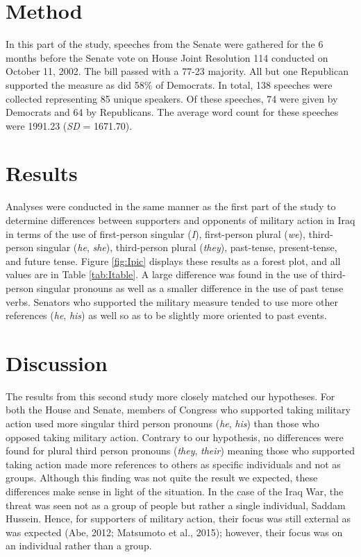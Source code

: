 \documentclass[english,man]{apa6}
\theoremstyle{definition}
\theoremstyle{definition}
\theoremstyle{definition}
\theoremstyle{remark}
\begin{document}
\section{Method}\label{method-4}

In this part of the study, speeches from the Senate were gathered for
the 6 months before the Senate vote on House Joint Resolution 114
conducted on October 11, 2002. The bill passed with a 77-23 majority.
All but one Republican supported the measure as did 58\% of Democrats.
In total, 138 speeches were collected representing 85 unique speakers.
Of these speeches, 74 were given by Democrats and 64 by Republicans. The
average word count for these speeches were 1991.23 (\emph{SD} =
1671.70).

\section{Results}\label{results-3}

Analyses were conducted in the same manner as the first part of the
study to determine differences between supporters and opponents of
military action in Iraq in terms of the use of first-person singular
(\emph{I}), first-person plural (\emph{we}), third-person singular
(\emph{he}, \emph{she}), third-person plural (\emph{they}), past-tense,
present-tense, and future tense. Figure \ref{fig:Ipic} displays these
results as a forest plot, and all values are in Table \ref{tab:Itable}.
A large difference was found in the use of third-person singular
pronouns as well as a smaller difference in the use of past tense verbs.
Senators who supported the military measure tended to use more other
references (\emph{he}, \emph{his}) as well so as to be slightly more
oriented to past events.

\section{Discussion}\label{discussion-1}

The results from this second study more closely matched our hypotheses.
For both the House and Senate, members of Congress who supported taking
military action used more singular third person pronouns (\emph{he},
\emph{his}) than those who opposed taking military action. Contrary to
our hypothesis, no differences were found for plural third person
pronouns (\emph{they}, \emph{their}) meaning those who supported taking
action made more references to others as specific individuals and not as
groups. Although this finding was not quite the result we expected,
these differences make sense in light of the situation. In the case of
the Iraq War, the threat was seen not as a group of people but rather a
single individual, Saddam Hussein. Hence, for supporters of military
action, their focus was still external as was expected (Abe, 2012;
Matsumoto et al., 2015); however, their focus was on an individual
rather than a group.
\end{document}
